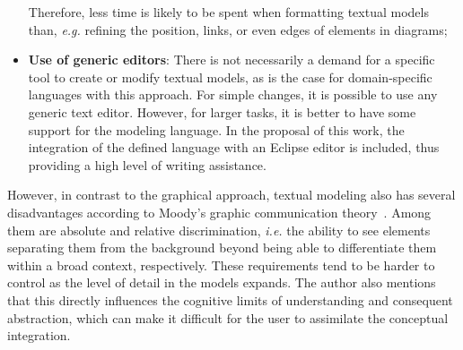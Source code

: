 \begin{itemize}
    Therefore, less time is likely to be spent when formatting textual models than, \textit{e.g.} refining the position, links, or even edges of elements in diagrams;
    \item \textbf{Use of generic editors}: 
    There is not necessarily a demand for a specific tool to create or modify textual models, as is the case for domain-specific languages with this approach.
    For simple changes, it is possible to use any generic text editor.
    However, for larger tasks, it is better to have some support for the modeling language.
    In the proposal of this work, the integration of the defined language with an Eclipse editor is included, thus providing a high level of writing assistance.
\end{itemize}


However, in contrast to the graphical approach, textual modeling also has several disadvantages according to Moody's graphic communication theory~\cite{Moody:2007}.
Among them are absolute and relative discrimination, \textit{i.e.} the ability to see elements separating them from the background beyond being able to differentiate them within a broad context, respectively.
These requirements tend to be harder to control as the level of detail in the models expands.
The author also mentions that this directly influences the cognitive limits of understanding and consequent abstraction, which can make it difficult for the user to assimilate the conceptual integration.

